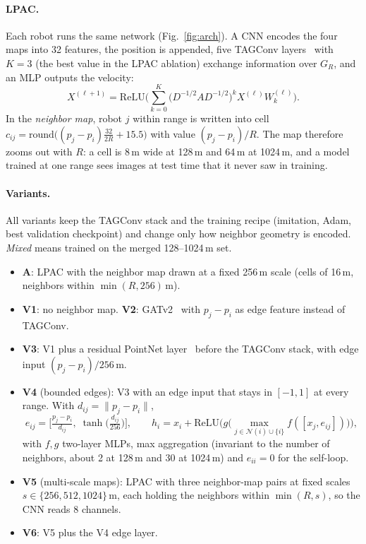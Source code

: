 \documentclass{article}
\begin{document}
\paragraph{LPAC.} Each robot runs the same network (Fig.~\ref{fig:arch}). A CNN encodes the four maps into 32 features, the position is appended, five TAGConv layers~\citep{du2017tagconv} with $K=3$ (the best value in the LPAC ablation) exchange information over $G_R$, and an MLP outputs the velocity:
\begin{equation}
X^{(\ell+1)}=\mathrm{ReLU}\Big(\textstyle\sum_{k=0}^{K}\big(D^{-1/2}AD^{-1/2}\big)^{k}X^{(\ell)}W_k^{(\ell)}\Big).
\end{equation}
In the \emph{neighbor map}, robot $j$ within range is written into cell $c_{ij}=\mathrm{round}\big((p_j-p_i)\tfrac{32}{2R}+15.5\big)$ with value $(p_j-p_i)/R$. The map therefore zooms out with $R$: a cell is 8\,m wide at 128\,m and 64\,m at 1024\,m, and a model trained at one range sees images at test time that it never saw in training.

\paragraph{Variants.} All variants keep the TAGConv stack and the training recipe (imitation, Adam, best validation checkpoint) and change only how neighbor geometry is encoded. \emph{Mixed} means trained on the merged 128--1024\,m set.
\begin{itemize}\setlength\itemsep{1pt}
\item \textbf{A}: LPAC with the neighbor map drawn at a fixed 256\,m scale (cells of 16\,m, neighbors within $\min(R,256)$\,m).
\item \textbf{V1}: no neighbor map. \textbf{V2}: GATv2~\citep{brody2022gatv2} with $p_j-p_i$ as edge feature instead of TAGConv.
\item \textbf{V3}: V1 plus a residual PointNet layer~\citep{qi2017pointnetpp} before the TAGConv stack, with edge input $(p_j-p_i)/256$\,m.
\item \textbf{V4} (bounded edges): V3 with an edge input that stays in $[-1,1]$ at every range. With $d_{ij}=\|p_j-p_i\|$,
\begin{equation}
e_{ij}=\Big[\tfrac{p_j-p_i}{d_{ij}},\;\tanh\!\big(\tfrac{d_{ij}}{256}\big)\Big],\qquad
h_i = x_i + \mathrm{ReLU}\Big(g\big(\max_{j\in\mathcal N(i)\cup\{i\}} f([x_j, e_{ij}])\big)\Big),
\end{equation}
with $f,g$ two-layer MLPs, max aggregation (invariant to the number of neighbors, about 2 at 128\,m and 30 at 1024\,m) and $e_{ii}=0$ for the self-loop.
\item \textbf{V5} (multi-scale maps): LPAC with three neighbor-map pairs at fixed scales $s\in\{256,512,1024\}$\,m, each holding the neighbors within $\min(R,s)$, so the CNN reads 8 channels.
\item \textbf{V6}: V5 plus the V4 edge layer.
\end{itemize}
\end{document}
